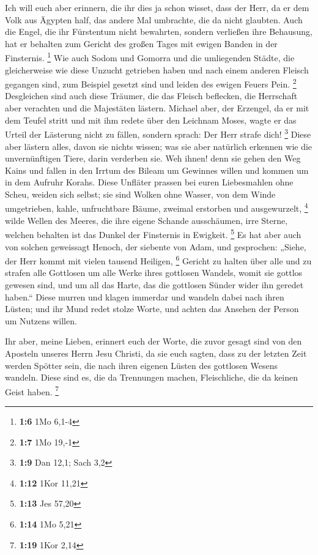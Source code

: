  Ich will euch aber erinnern, die ihr dies ja schon
wisset, dass der Herr, da er dem Volk aus Ägypten half, das andere Mal
umbrachte, die da nicht glaubten.  Auch die Engel, die ihr
Fürstentum nicht bewahrten, sondern verließen ihre Behausung, hat er
behalten zum Gericht des großen Tages mit ewigen Banden in der
Finsternis. \footnote{\textbf{1:6} 1Mo 6,1-4}  Wie auch
Sodom und Gomorra und die umliegenden Städte, die gleicherweise wie
diese Unzucht getrieben haben und nach einem anderen Fleisch gegangen
sind, zum Beispiel gesetzt sind und leiden des ewigen Feuers Pein.
\footnote{\textbf{1:7} 1Mo 19,-1}  Desgleichen sind auch
diese Träumer, die das Fleisch beflecken, die Herrschaft aber verachten
und die Majestäten lästern.  Michael aber, der Erzengel,
da er mit dem Teufel stritt und mit ihm redete über den Leichnam Moses,
wagte er das Urteil der Lästerung nicht zu fällen, sondern sprach: Der
Herr strafe dich! \footnote{\textbf{1:9} Dan 12,1; Sach 3,2}
 Diese aber lästern alles, davon sie nichts wissen; was
sie aber natürlich erkennen wie die unvernünftigen Tiere, darin
verderben sie.  Weh ihnen! denn sie gehen den Weg Kains
und fallen in den Irrtum des Bileam um Gewinnes willen und kommen um in
dem Aufruhr Korahs.  Diese Unfläter prassen bei euren
Liebesmahlen ohne Scheu, weiden sich selbst; sie sind Wolken ohne
Wasser, von dem Winde umgetrieben, kahle, unfruchtbare Bäume, zweimal
erstorben und ausgewurzelt, \footnote{\textbf{1:12} 1Kor 11,21}
 wilde Wellen des Meeres, die ihre eigene Schande
ausschäumen, irre Sterne, welchen behalten ist das Dunkel der Finsternis
in Ewigkeit. \footnote{\textbf{1:13} Jes 57,20}  Es hat
aber auch von solchen geweissagt Henoch, der siebente von Adam, und
gesprochen: „Siehe, der Herr kommt mit vielen tausend Heiligen,
\footnote{\textbf{1:14} 1Mo 5,21}  Gericht zu halten über
alle und zu strafen alle Gottlosen um alle Werke ihres gottlosen
Wandels, womit sie gottlos gewesen sind, und um all das Harte, das die
gottlosen Sünder wider ihn geredet haben.``  Diese murren
und klagen immerdar und wandeln dabei nach ihren Lüsten; und ihr Mund
redet stolze Worte, und achten das Ansehen der Person um Nutzens willen.

 Ihr aber, meine Lieben, erinnert euch der Worte, die
zuvor gesagt sind von den Aposteln unseres Herrn Jesu Christi,
 da sie euch sagten, dass zu der letzten Zeit werden
Spötter sein, die nach ihren eigenen Lüsten des gottlosen Wesens
wandeln.  Diese sind es, die da Trennungen machen,
Fleischliche, die da keinen Geist haben. \footnote{\textbf{1:19} 1Kor
  2,14}

